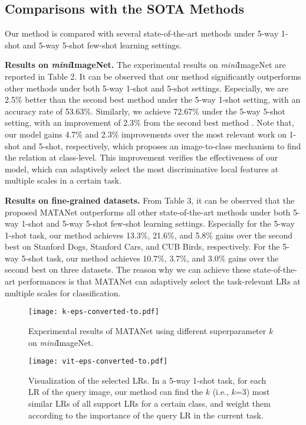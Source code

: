 \documentclass[final]{cvpr}
\begin{document}
	
	\subsection{Comparisons with the SOTA Methods}
	Our method is compared with several state-of-the-art methods under 5-way 1-shot and 5-way 5-shot few-shot learning settings.
	
	\textbf{Results on \emph{mini}ImageNet.} The experimental results on \emph{mini}ImageNet are reported in Table 2.  It can be observed that our method significantly outperforms other methods under both 5-way 1-shot and 5-shot settings. 
	Especially, we are 2.5\% better than the second best method \cite{flennerhag2019meta} under the 5-way 1-shot setting, with an accuracy rate of 53.63\%.  Similarly, we achieve 72.67\% under the 5-way 5-shot setting, with an improvement of 2.3\% from the second best method \cite{li2019revisiting}. Note that, our model gains 4.7\% and 2.3\% improvements over the most relevant work \cite{li2019revisiting} on 1-shot and 5-shot, respectively, which proposes an image-to-class mechanism to find the relation at class-level. This improvement verifies the effectiveness of our model, which can adaptively select the most discriminative local features at multiple scales in a certain task.
	
	\textbf{Results on fine-grained datasets.} From Table 3, it can be observed that the proposed MATANet outperforms all other state-of-the-art methods under both 5-way 1-shot and 5-way 5-shot few-shot learning settings. 
	Especially for the 5-way 1-shot task, our method achieves 13.3\%, 21.6\%, and 5.8\% gains over the second best on Stanford Dogs, Stanford Cars, and CUB Birds, respectively. For the 5-way 5-shot task, our method achieves 10.7\%, 3.7\%, and 3.0\% gains over the second best on three datasets.
	The reason why we can achieve these state-of-the-art performances is that MATANet can adaptively select the task-relevant LRs at multiple scales for classification. 

		\begin{figure}[t]
		\centering
		\texttt{[image: k-eps-converted-to.pdf]}
		\caption{Experimental results of MATANet using different superparameter $k$ on \emph{mini}ImageNet. }
		\label{influence k}
	\end{figure}
	\begin{figure*}[t]
		\centering
		\texttt{[image: vit-eps-converted-to.pdf]}
		\caption{Visualization of the selected LRs. In a 5-way 1-shot task, for each LR of the query image, our method can find the $k$ (i.e., $k$=3) most similar LRs of all support LRs for a certain class, and weight them according to the importance of the query LR in the current task. }
		\label{k}
	\end{figure*}
\end{document}
